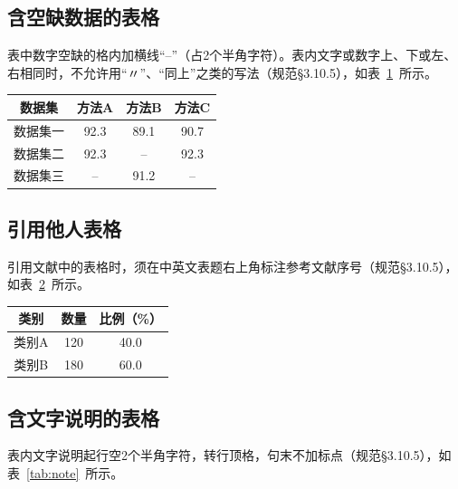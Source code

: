 \subsection{含空缺数据的表格}

表中数字空缺的格内加横线“--”（占2个半角字符）。表内文字或数字上、下或左、右相同时，不允许用“〃”、“同上”之类的写法（规范§3.10.5），如表~\ref{tab:missing}~所示。

\begin{table}[htbp]
    \centering
    \label{tab:missing}
    \begin{tabular}{cccc}
        \toprule
        \textbf{数据集} & \textbf{方法A} & \textbf{方法B} & \textbf{方法C} \\
        \midrule
        数据集一 & 92.3 & 89.1 & 90.7 \\
        数据集二 & 92.3 & --   & 92.3 \\
        数据集三 & --   & 91.2 & --   \\
        \bottomrule
    \end{tabular}
\end{table}

\subsection{引用他人表格}

引用文献中的表格时，须在中英文表题右上角标注参考文献序号（规范§3.10.5），如表~\ref{tab:cited}~所示。

\begin{table}[htbp]
    \centering
    \label{tab:cited}
    \begin{tabular}{ccc}
        \toprule
        \textbf{类别} & \textbf{数量} & \textbf{比例（\%）} \\
        \midrule
        类别A & 120 & 40.0 \\
        类别B & 180 & 60.0 \\
        \bottomrule
    \end{tabular}
\end{table}

\subsection{含文字说明的表格}

表内文字说明起行空2个半角字符，转行顶格，句末不加标点（规范§3.10.5），如表~\ref{tab:note}~所示。

